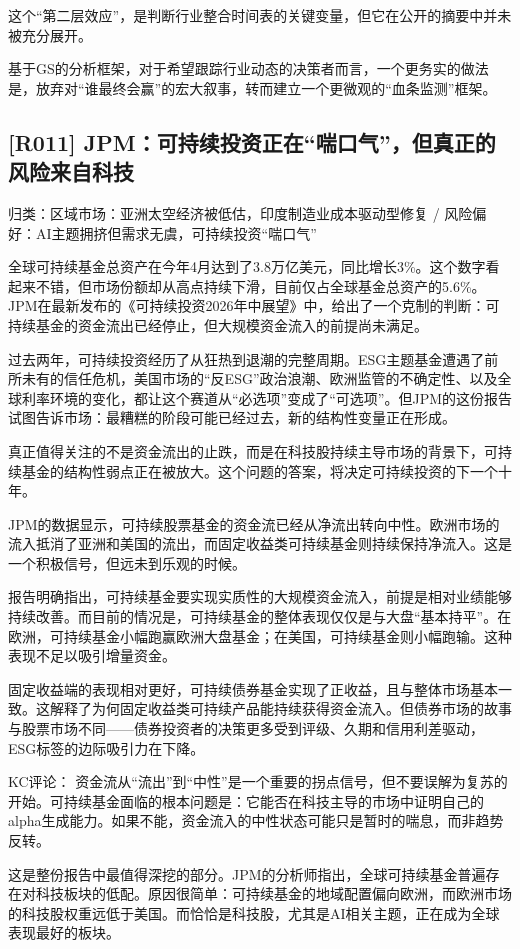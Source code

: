 \documentclass[11pt]{ctexart}
\begin{document}
这个“第二层效应”，是判断行业整合时间表的关键变量，但它在公开的摘要中并未被充分展开。

基于GS的分析框架，对于希望跟踪行业动态的决策者而言，一个更务实的做法是，放弃对“谁最终会赢”的宏大叙事，转而建立一个更微观的“血条监测”框架。

\subsection{[R011] JPM：可持续投资正在“喘口气”，但真正的风险来自科技}
{\small\color{refgray}归类：区域市场：亚洲太空经济被低估，印度制造业成本驱动型修复 / 风险偏好：AI主题拥挤但需求无虞，可持续投资“喘口气”}

全球可持续基金总资产在今年4月达到了3.8万亿美元，同比增长3\%。这个数字看起来不错，但市场份额却从高点持续下滑，目前仅占全球基金总资产的5.6\%。JPM在最新发布的《可持续投资2026年中展望》中，给出了一个克制的判断：可持续基金的资金流出已经停止，但大规模资金流入的前提尚未满足。

过去两年，可持续投资经历了从狂热到退潮的完整周期。ESG主题基金遭遇了前所未有的信任危机，美国市场的“反ESG”政治浪潮、欧洲监管的不确定性、以及全球利率环境的变化，都让这个赛道从“必选项”变成了“可选项”。但JPM的这份报告试图告诉市场：最糟糕的阶段可能已经过去，新的结构性变量正在形成。

真正值得关注的不是资金流出的止跌，而是在科技股持续主导市场的背景下，可持续基金的结构性弱点正在被放大。这个问题的答案，将决定可持续投资的下一个十年。

JPM的数据显示，可持续股票基金的资金流已经从净流出转向中性。欧洲市场的流入抵消了亚洲和美国的流出，而固定收益类可持续基金则持续保持净流入。这是一个积极信号，但远未到乐观的时候。

报告明确指出，可持续基金要实现实质性的大规模资金流入，前提是相对业绩能够持续改善。而目前的情况是，可持续基金的整体表现仅仅是与大盘“基本持平”。在欧洲，可持续基金小幅跑赢欧洲大盘基金；在美国，可持续基金则小幅跑输。这种表现不足以吸引增量资金。

固定收益端的表现相对更好，可持续债券基金实现了正收益，且与整体市场基本一致。这解释了为何固定收益类可持续产品能持续获得资金流入。但债券市场的故事与股票市场不同——债券投资者的决策更多受到评级、久期和信用利差驱动，ESG标签的边际吸引力在下降。

KC评论： 资金流从“流出”到“中性”是一个重要的拐点信号，但不要误解为复苏的开始。可持续基金面临的根本问题是：它能否在科技主导的市场中证明自己的alpha生成能力。如果不能，资金流入的中性状态可能只是暂时的喘息，而非趋势反转。

这是整份报告中最值得深挖的部分。JPM的分析师指出，全球可持续基金普遍存在对科技板块的低配。原因很简单：可持续基金的地域配置偏向欧洲，而欧洲市场的科技股权重远低于美国。而恰恰是科技股，尤其是AI相关主题，正在成为全球表现最好的板块。
\end{document}
